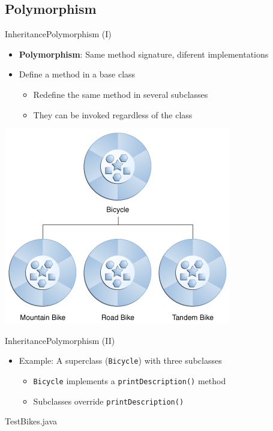 \documentclass[10pt,compress]{beamer} %
\begin{document}
\subsection{Polymorphism}
\begin{frame}{Inheritance}{Polymorphism (I)}
	\begin{itemize}
	\item \textbf{Polymorphism}: Same method signature, diferent implementations
	\item Define a method in a base class
	\begin{itemize}
	\item Redefine the same method in several subclasses
	\item They can be invoked regardless of the class
	\end{itemize}
	\end{itemize}

	\begin{center} \includegraphics[width=0.4\linewidth]{figs/concepts-bikeHierarchy.png}
	\end{center}
\end{frame}

\begin{frame}{Inheritance}{Polymorphism (II)}
	\begin{itemize}
	\item Example: A superclass (\texttt{Bicycle}) with three subclasses
		\begin{itemize}
		\item \texttt{Bicycle} implements a \texttt{printDescription()} method
		\item Subclasses override \texttt{printDescription()}
		\end{itemize}
	\end{itemize}

	\vspace{-0.2cm}
	\begin{block}{TestBikes.java}
		\vspace{-0.2cm}
		
		\vspace{-0.2cm}
	\end{block}
\end{frame}
\end{document}
